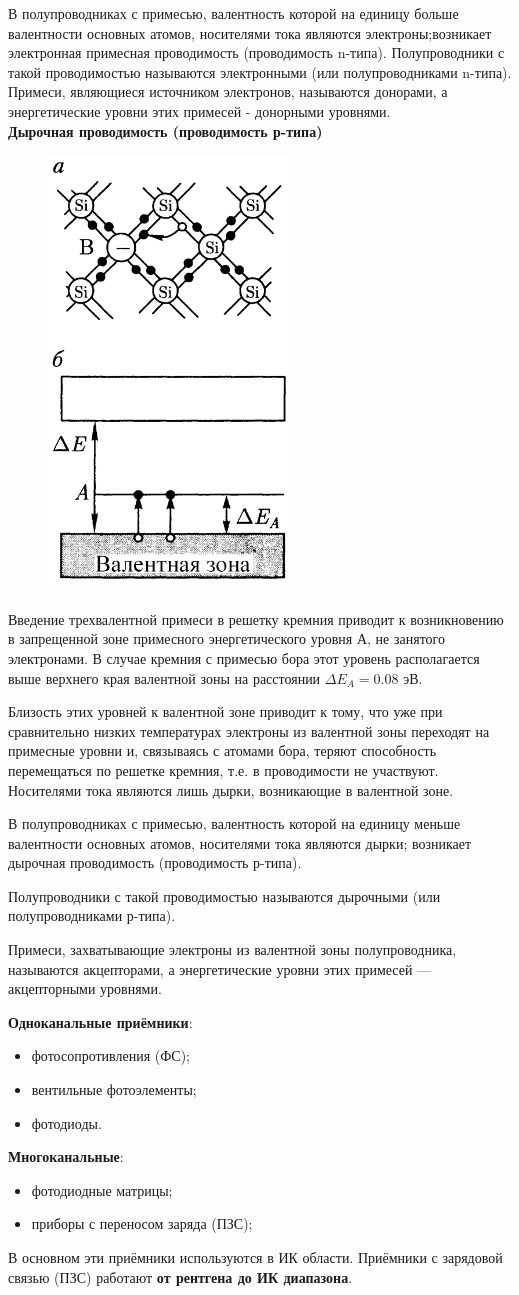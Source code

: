 \documentclass[12pt]{article}
\begin{document}
В полупроводниках с примесью, валентность которой на единицу
больше валентности основных атомов, носителями тока являются
электроны;возникает электронная примесная проводимость
(проводимость n-типа).
Полупроводники с такой проводимостью называются электронными
(или полупроводниками n-типа).
Примеси, являющиеся источником электронов, называются донорами,
а энергетические уровни этих примесей - донорными уровнями.\\
\textbf{Дырочная проводимость (проводимость р-типа)}\\
\begin{figure}
	\centering
	\includegraphics[width=0.2\linewidth]{"Снимок экрана от 2024-12-23 19-22-46"}
\end{figure}

Введение трехвалентной примеси в решетку
кремния приводит к возникновению в
запрещенной зоне примесного энергетического
уровня А, не занятого электронами. В случае
кремния с примесью бора этот уровень
располагается выше верхнего края валентной
зоны на расстоянии $\Delta E_A= 0.08$ эВ.

Близость этих уровней к валентной зоне приводит
к тому, что уже при сравнительно низких
температурах электроны из валентной зоны
переходят на примесные уровни и, связываясь с
атомами бора, теряют способность перемещаться
по решетке кремния, т.е. в проводимости не
участвуют. Носителями тока являются лишь
дырки, возникающие в валентной зоне.

В полупроводниках с примесью, валентность которой на
единицу меньше валентности основных атомов, носителями
тока являются дырки; возникает дырочная проводимость
(проводимость р-типа).

Полупроводники с такой проводимостью называются
дырочными (или полупроводниками р-типа).

Примеси, захватывающие электроны из валентной зоны
полупроводника, называются акцепторами, а энергетические
уровни этих примесей — акцепторными уровнями.


\textbf{Одноканальные приёмники}:
\begin{itemize}
	\item фотосопротивления (ФС);
	\item вентильные фотоэлементы;
	\item фотодиоды.
\end{itemize}
\textbf{Многоканальные}:
\begin{itemize}
	\item фотодиодные матрицы;
	\item приборы с переносом заряда (ПЗС);
\end{itemize}
В основном эти приёмники используются в ИК области.
Приёмники с зарядовой связью (ПЗС) работают \textbf{от рентгена до ИК диапазона}.
\end{document}
